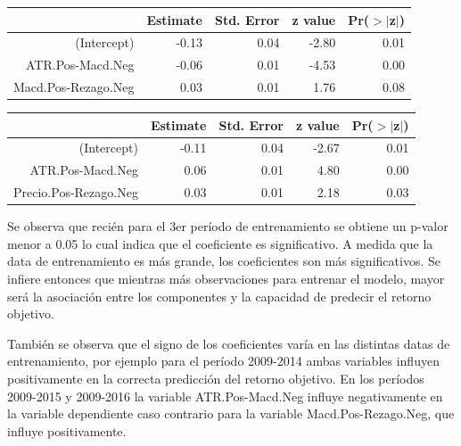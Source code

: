 \documentclass[a4paper,12pt]{Latex/Classes/PhDthesisPSnPDF}
\begin{document}
\begin{center}
\begin{table}[ht]
\centering
\begin{tabular}{rrrrr}
  \hline
 & Estimate & Std. Error & z value & Pr($>$$|$z$|$) \\ 
  \hline
(Intercept) & -0.13 & 0.04 & -2.80 & 0.01 \\ 
  ATR.Pos-Macd.Neg & -0.06 & 0.01 & -4.53 & 0.00 \\ 
  Macd.Pos-Rezago.Neg & 0.03 & 0.01 & 1.76 & 0.08 \\ 
   \hline
\end{tabular}
\end{table}\end{center}


\begin{center}
\begin{table}[ht]
\centering
\begin{tabular}{rrrrr}
  \hline
 & Estimate & Std. Error & z value & Pr($>$$|$z$|$) \\ 
  \hline
(Intercept) & -0.11 & 0.04 & -2.67 & 0.01 \\ 
  ATR.Pos-Macd.Neg & 0.06 & 0.01 & 4.80 & 0.00 \\ 
  Precio.Pos-Rezago.Neg & 0.03 & 0.01 & 2.18 & 0.03 \\ 
   \hline
\end{tabular}
\end{table}\end{center}

Se observa que recién para el 3er período de entrenamiento se obtiene un p-valor menor a 0.05 lo cual indica que el coeficiente es significativo. A medida que la data de entrenamiento es más grande, los coeficientes son más significativos. Se infiere entonces que mientras más observaciones para entrenar el modelo, mayor será la asociación entre los componentes y la capacidad de predecir el retorno objetivo.

También se observa que el signo de los coeficientes varía en las distintas datas de entrenamiento, por ejemplo para el período 2009-2014 ambas variables influyen positivamente en la correcta predicción del retorno objetivo. En los períodos 2009-2015 y 2009-2016 la variable ATR.Pos-Macd.Neg influye negativamente en la variable dependiente caso contrario para la variable Macd.Pos-Rezago.Neg, que influye positivamente.
\end{document}
